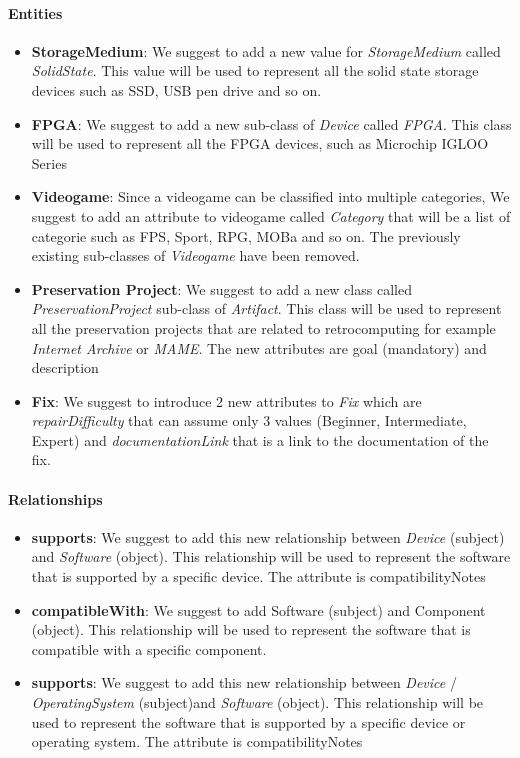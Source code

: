 \paragraph{Entities}
\begin{itemize}
    \item \textbf{StorageMedium}: We suggest to add a new value for \textit{StorageMedium} called \textit{SolidState}. This value will be used to represent all the solid state storage devices such as SSD, USB pen drive and so on.
    \item \textbf{FPGA}: We suggest to add a new sub-class of \textit{Device} called \textit{FPGA}. This class will be used to represent all the FPGA devices, such as Microchip IGLOO Series
    \item \textbf{Videogame}: Since a videogame can be classified into multiple categories, We suggest to add an attribute to videogame called \textit{Category} that will be a list of categorie such as FPS, Sport, RPG, MOBa and so on. The previously existing sub-classes of \textit{Videogame} have been removed.
    \item \textbf{Preservation Project}: We suggest to add a new class called \textit{PreservationProject} sub-class of \textit{Artifact}. This class will be used to represent all the preservation projects that are related to retrocomputing for example \textit{Internet Archive} or \textit{MAME}. The new attributes are goal (mandatory) and description 
    \item \textbf{Fix}: We suggest to introduce 2 new attributes to \textit{Fix} which are \textit{repairDifficulty} that can assume only 3 values (Beginner, Intermediate, Expert) and \textit{documentationLink} that is a link to the documentation of the fix.
\end{itemize}

\paragraph{Relationships}
\begin{itemize}
\item \textbf{supports}: We suggest to add this new relationship between \textit{Device} (subject) and \textit{Software} (object). This relationship will be used to represent the software that is supported by a specific device. The attribute is compatibilityNotes
\item \textbf{compatibleWith}: We suggest to add Software (subject) and Component (object). This relationship will be used to represent the software that is compatible with a specific component.
\item \textbf{supports}: We suggest to add this new relationship between \textit{Device} / \textit{OperatingSystem} (subject)and \textit{Software} (object). This relationship will be used to represent the software that is supported by a specific device or operating system. The attribute is compatibilityNotes
\end{itemize}

